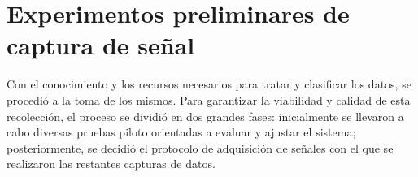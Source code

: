 \chapter{Experimentos preliminares de captura de señal}
\label{cap:experimentosPreliminares}

Con el conocimiento y los recursos necesarios para tratar y clasificar los datos, se procedió a la toma de los mismos. Para garantizar la viabilidad y calidad de esta recolección, el proceso se dividió en dos grandes fases: inicialmente se llevaron a cabo diversas pruebas piloto orientadas a evaluar y ajustar el sistema; posteriormente, se decidió el protocolo de adquisición de señales con el que se realizaron las restantes capturas de datos.


